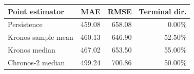 \begin{tabular}{lrrr}
\toprule
Point estimator & MAE & RMSE & Terminal dir. \\
\midrule
Persistence & 459.08 & 658.08 & 0.00\% \\
Kronos sample mean & 460.13 & 646.90 & 52.50\% \\
Kronos median & 467.02 & 653.50 & 55.00\% \\
Chronos-2 median & 499.24 & 700.86 & 50.00\% \\
\bottomrule
\end{tabular}
